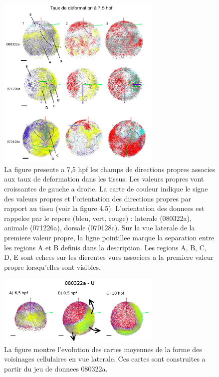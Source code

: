 \begin{figure}
\begin{center}
\includegraphics[width=0.7\textwidth]{../../images/Reconstruction/these_lombardot/p180_deformation_rate.png}
\end{center}
\caption{La figure presente a 7,5 hpf les champs de directions propres associes aux taux de deformation dans les tissus. Les valeurs propres vont croissantes de gauche a droite. La carte de couleur indique le signe des valeurs propres et l'orientation des directions propres par rapport au tissu (voir la figure 4.5). L'orientation des donnees est rappelee par le repere (bleu, vert, rouge) : laterale (080322a), animale (071226a), dorsale (070128c). Sur la vue laterale de la premiere valeur propre, la ligne pointillee marque la separation entre les regions A et B definis dans la description. Les regions A, B, C, D, E sont  echees sur les dierentes vues associees a la premiere valeur propre lorsqu'elles sont visibles.}
\label{these_lombardot_p180_deformation_rate}
\end{figure}
\begin{figure}
\begin{center}
\includegraphics[width=0.7\textwidth]{../../images/Reconstruction/these_lombardot/p200_neighbor_shape_U.png}
\end{center}
\caption{La figure montre l'evolution des cartes moyennes de la forme des voisinages cellulaires en vue laterale. Ces cartes sont construites a partir du jeu de donnees 080322a.}
\label{these_lombardot_p200_neighbor_shape_U}
\end{figure}
